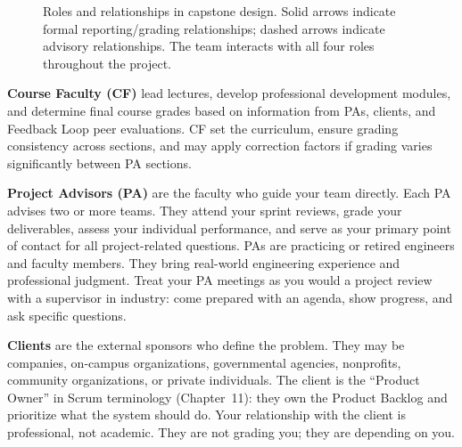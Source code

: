 \begin{figure}[htbp]
\centering
{}
\caption{Roles and relationships in capstone design. Solid arrows indicate formal reporting/grading relationships; dashed arrows indicate advisory relationships. The team interacts with all four roles throughout the project.}\label{fig:whos-who}
\end{figure}

\textbf{Course Faculty (CF)} lead lectures, develop professional development modules, and determine final course grades based on information from PAs, clients, and Feedback Loop peer evaluations. CF set the curriculum, ensure grading consistency across sections, and may apply correction factors if grading varies significantly between PA sections.

\textbf{Project Advisors (PA)} are the faculty who guide your team directly. Each PA advises two or more teams. They attend your sprint reviews, grade your deliverables, assess your individual performance, and serve as your primary point of contact for all project-related questions. PAs are practicing or retired engineers and faculty members. They bring real-world engineering experience and professional judgment. Treat your PA meetings as you would a project review with a supervisor in industry: come prepared with an agenda, show progress, and ask specific questions.

\textbf{Clients} are the external sponsors who define the problem. They may be companies, on-campus organizations, governmental agencies, nonprofits, community organizations, or private individuals. The client is the ``Product Owner'' in Scrum terminology (Chapter~11): they own the Product Backlog and prioritize what the system should do. Your relationship with the client is professional, not academic. They are not grading you; they are depending on you.

